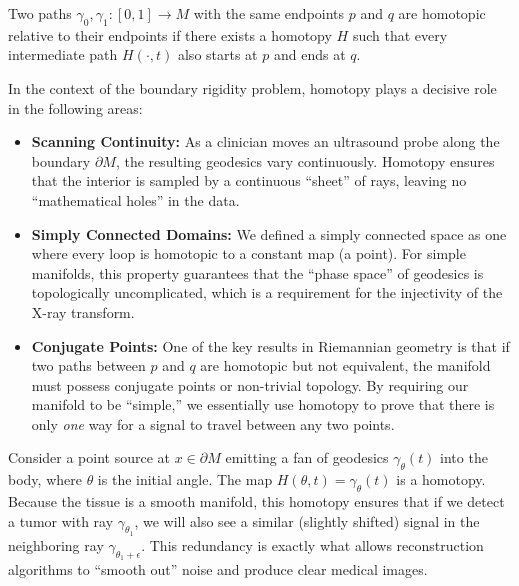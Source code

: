 \begin{definition}
  Two paths $\gamma_0, \gamma_1 : [0, 1] \to M$ with the same endpoints $p$ and $q$ are homotopic relative to their endpoints if there exists a homotopy $H$ such that every intermediate path $H(\cdot, t)$ also starts at $p$ and ends at $q$.
\end{definition}

In the context of the boundary rigidity problem, homotopy plays a decisive role in the following areas:
\begin{itemize}
  \item \textbf{Scanning Continuity:} As a clinician moves an ultrasound probe along the boundary $\partial M$, the resulting geodesics vary continuously. Homotopy ensures that the interior is sampled by a continuous ``sheet'' of rays, leaving no ``mathematical holes'' in the data.
  \item \textbf{Simply Connected Domains:} We defined a simply connected space as one where every loop is homotopic to a constant map (a point). For simple manifolds, this property guarantees that the ``phase space'' of geodesics is topologically uncomplicated, which is a requirement for the injectivity of the X-ray transform.
  \item \textbf{Conjugate Points:} One of the key results in Riemannian geometry is that if two paths between $p$ and $q$ are homotopic but not equivalent, the manifold must possess conjugate points or non-trivial topology. By requiring our manifold to be ``simple,'' we essentially use homotopy to prove that there is only \emph{one} way for a signal to travel between any two points.
\end{itemize}

\begin{example}
  Consider a point source at $x \in \partial M$ emitting a fan of geodesics $\gamma_\theta(t)$ into the body, where $\theta$ is the initial angle. The map $H(\theta, t) = \gamma_\theta(t)$ is a homotopy. Because the tissue is a smooth manifold, this homotopy ensures that if we detect a tumor with ray $\gamma_{\theta_1}$, we will also see a similar (slightly shifted) signal in the neighboring ray $\gamma_{\theta_1 + \epsilon}$. This redundancy is exactly what allows reconstruction algorithms to ``smooth out'' noise and produce clear medical images.
\end{example}
